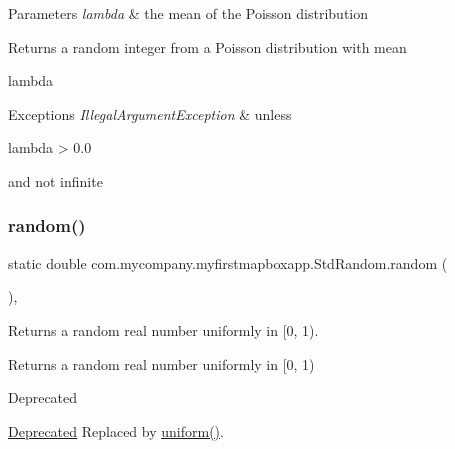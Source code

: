 \begin{DoxyParams}{Parameters}
{\em lambda} & the mean of the Poisson distribution \\
\hline
\end{DoxyParams}
\begin{DoxyReturn}{Returns}
a random integer from a Poisson distribution with mean
\begin{DoxyCode}
lambda 
\end{DoxyCode}
 
\end{DoxyReturn}

\begin{DoxyExceptions}{Exceptions}
{\em Illegal\+Argument\+Exception} & unless
\begin{DoxyCode}
lambda > 0.0 
\end{DoxyCode}
 and not infinite \\
\hline
\end{DoxyExceptions}
\mbox{\label{classcom_1_1mycompany_1_1myfirstmapboxapp_1_1_std_random_a53662c3ead473d564aeb863633814a16}} 
\subsubsection{\texorpdfstring{random()}{random()}}
{\footnotesize\ttfamily static double com.\+mycompany.\+myfirstmapboxapp.\+Std\+Random.\+random (\begin{DoxyParamCaption}{ }\end{DoxyParamCaption})\hspace{0.3cm}{\ttfamily [inline]}, {\ttfamily [static]}}

Returns a random real number uniformly in \mbox{[}0, 1).

\begin{DoxyReturn}{Returns}
a random real number uniformly in \mbox{[}0, 1) 
\end{DoxyReturn}
\begin{DoxyRefDesc}{Deprecated}
\item[\hyperlink{deprecated__deprecated000004}{Deprecated}]Replaced by \hyperlink{classcom_1_1mycompany_1_1myfirstmapboxapp_1_1_std_random_affb3ca5a5bdc0eb1f1fcdc0d536eddaf}{uniform()}. \end{DoxyRefDesc}
\mbox{\label{classcom_1_1mycompany_1_1myfirstmapboxapp_1_1_std_random_ad19c856e85e391ed6ea1d593449503a2}} 
